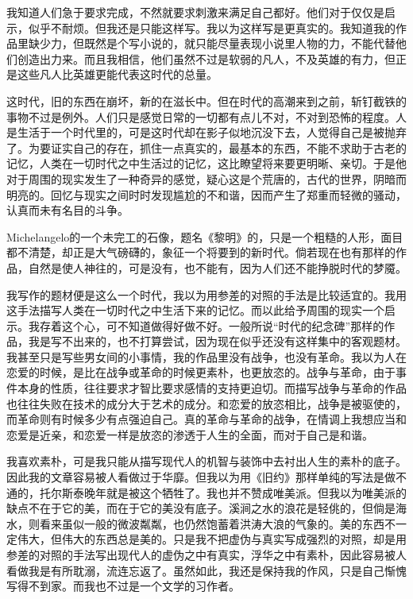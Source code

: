 \par 我知道人们急于要求完成，不然就要求刺激来满足自己都好。他们对于仅仅是启示，似乎不耐烦。但我还是只能这样写。我以为这样写是更真实的。我知道我的作品里缺少力，但既然是个写小说的，就只能尽量表现小说里人物的力，不能代替他们创造出力来。而且我相信，他们虽然不过是软弱的凡人，不及英雄的有力，但正是这些凡人比英雄更能代表这时代的总量。
\par 这时代，旧的东西在崩坏，新的在滋长中。但在时代的高潮来到之前，斩钉截铁的事物不过是例外。人们只是感觉日常的一切都有点儿不对，不对到恐怖的程度。人是生活于一个时代里的，可是这时代却在影子似地沉没下去，人觉得自己是被抛弃了。为要证实自己的存在，抓住一点真实的，最基本的东西，不能不求助于古老的记忆，人类在一切时代之中生活过的记忆，这比瞭望将来要更明晰、亲切。于是他对于周围的现实发生了一种奇异的感觉，疑心这是个荒唐的，古代的世界，阴暗而明亮的。回忆与现实之间时时发现尴尬的不和谐，因而产生了郑重而轻微的骚动，认真而未有名目的斗争。
\par Michelangelo的一个未完工的石像，题名《黎明》的，只是一个粗糙的人形，面目都不清楚，却正是大气磅礴的，象征一个将要到的新时代。倘若现在也有那样的作品，自然是使人神往的，可是没有，也不能有，因为人们还不能挣脱时代的梦魇。
\par 我写作的题材便是这么一个时代，我以为用参差的对照的手法是比较适宜的。我用这手法描写人类在一切时代之中生活下来的记忆。而以此给予周围的现实一个启示。我存着这个心，可不知道做得好做不好。一般所说“时代的纪念碑”那样的作品，我是写不出来的，也不打算尝试，因为现在似乎还没有这样集中的客观题材。我甚至只是写些男女间的小事情，我的作品里没有战争，也没有革命。我以为人在恋爱的时候，是比在战争或革命的时候更素朴，也更放恣的。战争与革命，由于事件本身的性质，往往要求才智比要求感情的支持更迫切。而描写战争与革命的作品也往往失败在技术的成分大于艺术的成分。和恋爱的放恣相比，战争是被驱使的，而革命则有时候多少有点强迫自己。真的革命与革命的战争，在情调上我想应当和恋爱是近亲，和恋爱一样是放恣的渗透于人生的全面，而对于自己是和谐。
\par 我喜欢素朴，可是我只能从描写现代人的机智与装饰中去衬出人生的素朴的底子。因此我的文章容易被人看做过于华靡。但我以为用《旧约》那样单纯的写法是做不通的，托尔斯泰晚年就是被这个牺牲了。我也并不赞成唯美派。但我以为唯美派的缺点不在于它的美，而在于它的美没有底子。溪涧之水的浪花是轻佻的，但倘是海水，则看来虽似一般的微波粼粼，也仍然饱蓄着洪涛大浪的气象的。美的东西不一定伟大，但伟大的东西总是美的。只是我不把虚伪与真实写成强烈的对照，却是用参差的对照的手法写出现代人的虚伪之中有真实，浮华之中有素朴，因此容易被人看做我是有所耽溺，流连忘返了。虽然如此，我还是保持我的作风，只是自己惭愧写得不到家。而我也不过是一个文学的习作者。
